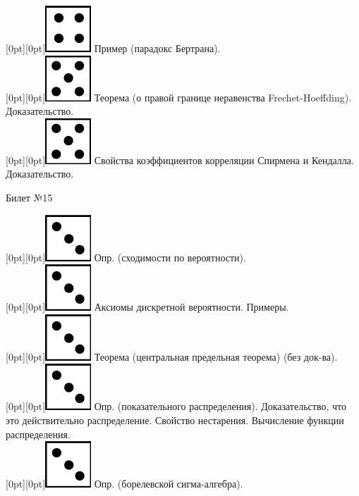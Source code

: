 \documentclass[10pt]{article}
\begin{document}
\raisebox{-1pt}[0pt][0pt]{\includegraphics[width=0.02\linewidth]{4.png}} Пример (парадокс Бертрана). \\ 

\raisebox{-1pt}[0pt][0pt]{\includegraphics[width=0.02\linewidth]{5.png}} Теорема (о правой границе неравенства Frechet-Hoeffding).  Доказательство. \\

\raisebox{-1pt}[0pt][0pt]{\includegraphics[width=0.02\linewidth]{5.png}} Свойства коэффициентов корреляции Спирмена и Кендалла. Доказательство. \\ 

\begin{center} {\Large Билет №15} \end{center} 

\raisebox{-1pt}[0pt][0pt]{\includegraphics[width=0.02\linewidth]{3.png}} Опр. (сходимости по вероятности). \\

\raisebox{-1pt}[0pt][0pt]{\includegraphics[width=0.02\linewidth]{3.png}} Аксиомы дискретной вероятности. Примеры. \\

\raisebox{-1pt}[0pt][0pt]{\includegraphics[width=0.02\linewidth]{3.png}} Теорема (центральная предельная теорема) (без док-ва). \\

\raisebox{-1pt}[0pt][0pt]{\includegraphics[width=0.02\linewidth]{3.png}}  Опр. (показательного распределения). Доказательство, что это действительно распределение. Свойство нестарения. Вычисление функции распределения.  \\  

\raisebox{-1pt}[0pt][0pt]{\includegraphics[width=0.02\linewidth]{3.png}} Опр. (борелевской сигма-алгебра). \\
\end{document}

